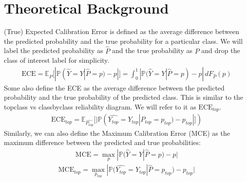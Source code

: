 \documentclass[letterpaper,10pt,english]{sphinxmanual}
\begin{document}
\section{Theoretical Background}
\label{\detokenize{notebooks/ece_mce:Theoretical-Background}}
\sphinxAtStartPar
(True) Expected Calibration Error is defined as the average difference between the predicted probability and the true probability for a particular class. We will label the predicted probability as \(\hat{P}\) and the true probability as \(P\) and drop the class of interest label for simplicity.
\begin{equation*}
\begin{split}\text{ECE} = \mathbb{E}_{\hat{P}} [|\mathbb{P}(\hat{Y}=Y|\hat{P}=p)-p|] = \int_0^1 |\mathbb{P}(\hat{Y}=Y|\hat{P}=p)-p| \, dF_{\hat{P}}(p)\end{split}
\end{equation*}
\sphinxAtStartPar
Some also define the ECE as the average difference between the predicted probability and the true probability of the predicted class. This is similar to the top\sphinxhyphen{}class vs class\sphinxhyphen{}by\sphinxhyphen{}class reliability diagram. We will refer to it as \(\text{ECE}_{top}\).
\begin{equation*}
\begin{split}\text{ECE}_{top} = \mathbb{E}_{\hat{P_{top}}} [|\mathbb{P}(\hat{Y_{top}}=Y_{top}|\hat{P_{top}}=p_{top})-p_{top}|])\end{split}
\end{equation*}
\sphinxAtStartPar
Similarly, we can also define the Maximum Calibration Error (MCE) as the maximum difference between the predicted and true probabilities:
\begin{equation*}
\begin{split}\text{MCE} = \max_p |\mathbb{P}(\hat{Y}=Y|\hat{P}=p)-p|\end{split}
\end{equation*}\begin{equation*}
\begin{split}\text{MCE}_{top} = \max_{p_{top}}|\mathbb{P}(\hat{Y_{top}}=Y_{top}|\hat{P}=p_{top})-p_{top}|\end{split}
\end{equation*}
\end{document}
